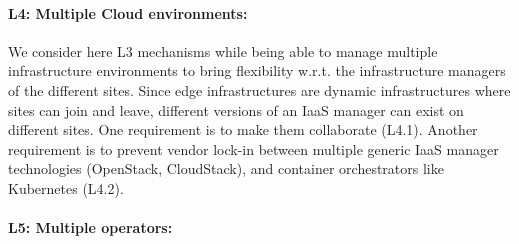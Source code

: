 \paragraph{L4: Multiple Cloud environments:}
We consider here L3 mechanisms while being able to manage multiple
infrastructure environments to bring flexibility w.r.t. the
infrastructure managers of the different sites. Since edge infrastructures are
dynamic infrastructures where sites can join and leave, different versions of an
IaaS manager can exist on different sites. One requirement is to make them
collaborate (L4.1). Another requirement is to prevent vendor lock-in between
multiple generic IaaS manager technologies (\eg OpenStack, CloudStack), and
container orchestrators like Kubernetes (L4.2).

\paragraph{L5: Multiple operators:}


